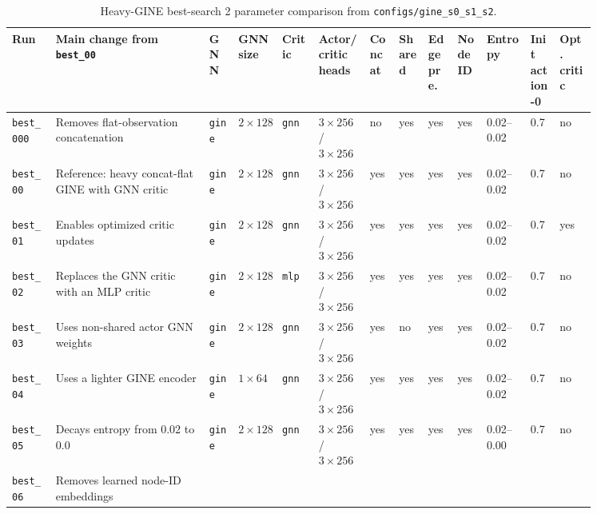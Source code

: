 \begin{landscape}
\begin{table}[p]
  \centering
  \tiny
  \caption{Heavy-GINE best-search 2 parameter comparison from
  \texttt{configs/gine\_s0\_s1\_s2}.}
  \label{tab:heavy-gine-configurations}
  \setlength{\tabcolsep}{2pt}
  \renewcommand{\arraystretch}{1.12}
  \begin{tabular}{L{0.065\linewidth}L{0.215\linewidth}L{0.045\linewidth}L{0.060\linewidth}L{0.050\linewidth}L{0.075\linewidth}L{0.045\linewidth}L{0.045\linewidth}L{0.045\linewidth}L{0.045\linewidth}L{0.060\linewidth}L{0.045\linewidth}L{0.055\linewidth}}
    \toprule
    Run & Main change from \texttt{best\_00} & GNN & GNN size & Critic &
    Actor/critic heads & Concat & Shared & Edge pre. & Node ID & Entropy &
    Init action-0 & Opt. critic \\
    \midrule
    \texttt{best\_000} & Removes flat-observation concatenation &
    \texttt{gine} & \(2\times128\) & \texttt{gnn} & \(3\times256\) / \(3\times256\) &
    no & yes & yes & yes & 0.02--0.02 & 0.7 & no \\
    \texttt{best\_00} & Reference: heavy concat-flat GINE with GNN critic &
    \texttt{gine} & \(2\times128\) & \texttt{gnn} & \(3\times256\) / \(3\times256\) &
    yes & yes & yes & yes & 0.02--0.02 & 0.7 & no \\
    \texttt{best\_01} & Enables optimized critic updates &
    \texttt{gine} & \(2\times128\) & \texttt{gnn} & \(3\times256\) / \(3\times256\) &
    yes & yes & yes & yes & 0.02--0.02 & 0.7 & yes \\
    \texttt{best\_02} & Replaces the GNN critic with an MLP critic &
    \texttt{gine} & \(2\times128\) & \texttt{mlp} & \(3\times256\) / \(3\times256\) &
    yes & yes & yes & yes & 0.02--0.02 & 0.7 & no \\
    \texttt{best\_03} & Uses non-shared actor GNN weights &
    \texttt{gine} & \(2\times128\) & \texttt{gnn} & \(3\times256\) / \(3\times256\) &
    yes & no & yes & yes & 0.02--0.02 & 0.7 & no \\
    \texttt{best\_04} & Uses a lighter GINE encoder &
    \texttt{gine} & \(1\times64\) & \texttt{gnn} & \(3\times256\) / \(3\times256\) &
    yes & yes & yes & yes & 0.02--0.02 & 0.7 & no \\
    \texttt{best\_05} & Decays entropy from 0.02 to 0.0 &
    \texttt{gine} & \(2\times128\) & \texttt{gnn} & \(3\times256\) / \(3\times256\) &
    yes & yes & yes & yes & 0.02--0.00 & 0.7 & no \\
    \texttt{best\_06} & Removes learned node-ID embeddings &

\end{tabular}
\end{table}
\end{landscape}

